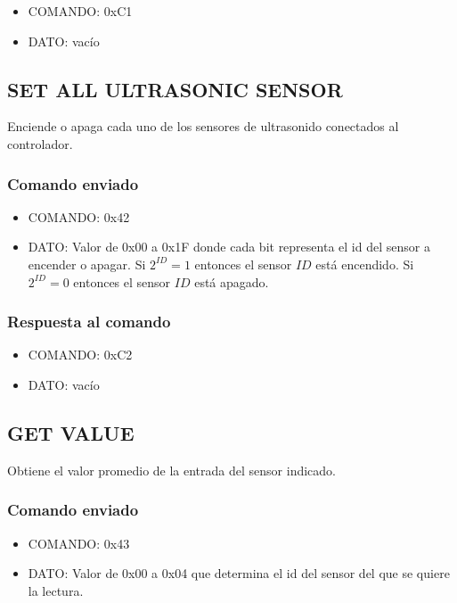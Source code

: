 \documentclass[a4paper,10pt]{article}
\begin{document}
\begin{itemize}
	\item{COMANDO:} 0xC1
	\item{DATO:} vac\'io
\end{itemize}

\subsection{SET ALL ULTRASONIC SENSOR}
\label{set_all_ultrasonic_sensor}

Enciende o apaga cada uno de los sensores de ultrasonido conectados al controlador.

\subsubsection*{Comando enviado}

\begin{itemize}
	\item{COMANDO:} 0x42
	\item{DATO:} Valor de 0x00 a 0x1F donde cada bit representa el id del sensor a encender o apagar.
	Si $2^{ID} = 1$ entonces el sensor $ID$ est\'a encendido.
	Si $2^{ID} = 0$ entonces el sensor $ID$ est\'a apagado.
\end{itemize}

\subsubsection*{Respuesta al comando}

\begin{itemize}
	\item{COMANDO:} 0xC2
	\item{DATO:} vac\'io
\end{itemize}

\subsection{GET VALUE}
\label{get_value_us}

Obtiene el valor promedio de la entrada del sensor indicado.

\subsubsection*{Comando enviado}

\begin{itemize}
	\item{COMANDO:} 0x43
	\item{DATO:} Valor de 0x00 a 0x04 que determina el id del sensor del que se quiere la lectura.
\end{itemize}
\end{document}
